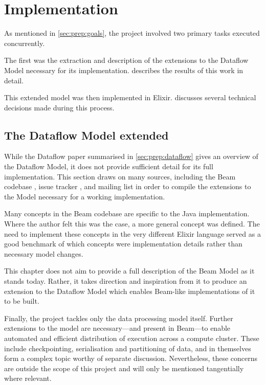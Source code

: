 \chapter{Implementation}\label{ch:impl}

As mentioned in \cref{sec:prep:goals}, the project involved two primary tasks executed concurrently.

The first was the extraction and description of the extensions to the Dataflow Model necessary for its implementation.
 describes the results of this work in detail.

This extended model was then implemented in Elixir.
 discusses several technical decisions made during this process.

\section{The Dataflow Model extended}\label{sec:impl:dataflow}

While the Dataflow paper \cite{Akidau:2015} summarised in \cref{sec:prep:dataflow} gives an overview of the Dataflow Model, it does not provide sufficient detail for its full implementation.
This section draws on many sources, including the Beam codebase \cite{Beam-code}, issue tracker \cite{Beam-JIRA}, and mailing list \cite{Beam-mailing} in order to compile the extensions to the Model necessary for a working implementation.

Many concepts in the Beam codebase are specific to the Java implementation.
Where the author felt this was the case, a more general concept was defined.
The need to implement these concepts in the very different Elixir language served as a good benchmark of which concepts were implementation details rather than necessary model changes.

This chapter does not aim to provide a full description of the Beam Model as it stands today.
Rather, it takes direction and inspiration from it to produce an extension to the Dataflow Model which enables Beam-like implementations of it to be built.

Finally, the project tackles only the data processing model itself.
Further extensions to the model are necessary---and present in Beam---to enable automated and efficient distribution of execution across a compute cluster.
These include checkpointing, serialisation and partitioning of data, and in themselves form a complex topic worthy of separate discussion.
Nevertheless, these concerns are outside the scope of this project and will only be mentioned tangentially where relevant.

